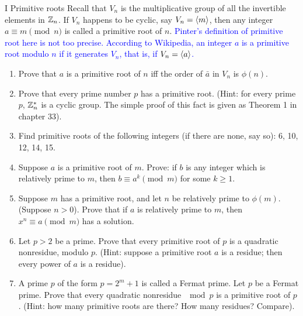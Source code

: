 \begin{exercise}{I Primitive roots}
Recall that $V_{n}$ is the multiplicative group of all the invertible elements in $\mathbb{Z}_{n}$. If $V_{n}$ happens to be cyclic, say $V_{n}=\langle m\rangle$, then any integer $a\equiv m\pmod{n}$ is called a primitive root of $n$. \textcolor{blue}{Pinter's definition of primitive root here is not too precise. According to Wikipedia, an integer $a$ is a primitive root modulo $n$ if it generates $V_n$, that is, if $V_n=\langle a\rangle$.}
 \begin{enumerate}
     \item Prove that $a$ is a primitive root of $n$ iff the order of $\bar{a}$ in $V_{n}$ is $\phi(n)$.
     \item Prove that every prime number $p$ has a primitive root. (Hint: for every prime $p$, $\mathbb{Z}^{*}_{n}$ is a cyclic group. The simple proof of this fact is given as Theorem 1 in chapter 33).
     \item Find primitive roots of the following integers (if there are none, say so): 6, 10, 12, 14, 15.
     \item Suppose $a$ is a primitive root of $m$. Prove: if $b$ is any integer which is relatively prime to $m$, then $b\equiv a^{k}\pmod{m}$ for some $k\geq 1$.
     \item Suppose $m$ has a primitive root, and let $n$ be relatively prime to $\phi(m)$. (Suppose $n>0$). Prove that if $a$ is relatively prime to $m$, then $x^{n}\equiv a\pmod{m}$ has a solution.
     \item Let $p>2$ be a prime. Prove that every primitive root of $p$ is a quadratic nonresidue, modulo $p$. (Hint: suppose a primitive root $a$ is a residue; then every power of $a$ is a residue).
     \item A prime $p$ of the form $p=2^{m}+1$ is called a Fermat prime. Let $p$ be a Fermat prime. Prove that every quadratic nonresidue $\mod{p}$ is a primitive root of $p$. (Hint: how many primitive roots are there? How many residues? Compare).
 \end{enumerate}
\end{exercise}
